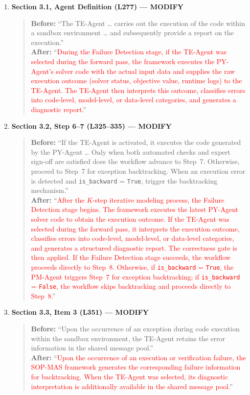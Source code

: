 \documentclass[11pt,a4paper]{article}
\begin{document}
\begin{enumerate}
\item \textbf{Section 3.1, Agent Definition (L277) --- MODIFY}
\begin{quote}
\textbf{Before:} ``The TE-Agent \ldots{} carries out the execution of the code within a sandbox environment \ldots{} and subsequently provide a report on the execution.''\\[4pt]
\textbf{After:} ``\textcolor{red}{During the Failure Detection stage, if the TE-Agent was selected during the forward pass, the framework executes the PY-Agent's solver code with the actual input data and supplies the raw execution outcome (solver status, objective value, runtime logs) to the TE-Agent. The TE-Agent then interprets this outcome, classifies errors into code-level, model-level, or data-level categories, and generates a diagnostic report.}'' 
\end{quote}

\item \textbf{Section 3.2, Step 6--7 (L325--335) --- MODIFY}
\begin{quote}
\textbf{Before:} ``If the TE-Agent is activated, it executes the code generated by the PY-Agent \ldots{} Only when both automated checks and expert sign-off are satisfied does the workflow advance to Step~7. Otherwise, proceed to Step~7 for exception backtracking. When an execution error is detected and \texttt{is\_backward} = \texttt{True}, trigger the backtracking mechanism.''\\[4pt]
\textbf{After:} ``\textcolor{red}{After the $K$-step iterative modeling process, the Failure Detection stage begins. The framework executes the latest PY-Agent solver code to obtain the execution outcome. If the TE-Agent was selected during the forward pass, it interprets the execution outcome, classifies errors into code-level, model-level, or data-level categories, and generates a structured diagnostic report. The correctness gate is then applied. If the Failure Detection stage succeeds, the workflow proceeds directly to Step~8. Otherwise, if \texttt{is\_backward} = \texttt{True}, the PM-Agent triggers Step~7 for exception backtracking; if \texttt{is\_backward} = \texttt{False}, the workflow skips backtracking and proceeds directly to Step~8.}''
\end{quote}

\item \textbf{Section 3.3, Item 3 (L351) --- MODIFY}
\begin{quote}
\textbf{Before:} ``Upon the occurrence of an exception during code execution within the sandbox environment, the TE-Agent retains the error information in the shared message pool.''\\[4pt]
\textbf{After:} ``\textcolor{red}{Upon the occurrence of an execution or verification failure, the SOP-MAS framework generates the corresponding failure information for backtracking. When the TE-Agent was selected, its diagnostic interpretation is additionally available in the shared message pool.}'' 
\end{quote}

\end{enumerate}
\end{document}
